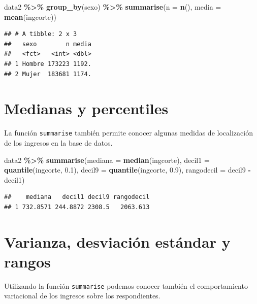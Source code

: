 \documentclass[
  12pt,
]{book}
\newenvironment{Shaded}{\begin{snugshade}}{\end{snugshade}}
\newcommand{\AttributeTok}[1]{\textcolor[rgb]{0.13,0.29,0.53}{#1}}
\newcommand{\FloatTok}[1]{\textcolor[rgb]{0.00,0.00,0.81}{#1}}
\newcommand{\FunctionTok}[1]{\textcolor[rgb]{0.13,0.29,0.53}{\textbf{#1}}}
\newcommand{\NormalTok}[1]{#1}
\newcommand{\SpecialCharTok}[1]{\textcolor[rgb]{0.81,0.36,0.00}{\textbf{#1}}}
\begin{document}
\begin{Shaded}
\begin{Highlighting}[]
\NormalTok{data2 }\SpecialCharTok{\%\textgreater{}\%} \FunctionTok{group\_by}\NormalTok{(sexo) }\SpecialCharTok{\%\textgreater{}\%}
  \FunctionTok{summarise}\NormalTok{(}\AttributeTok{n =} \FunctionTok{n}\NormalTok{(),}
            \AttributeTok{media =} \FunctionTok{mean}\NormalTok{(ingcorte))}
\end{Highlighting}
\end{Shaded}

\begin{verbatim}
## # A tibble: 2 x 3
##   sexo        n media
##   <fct>   <int> <dbl>
## 1 Hombre 173223 1192.
## 2 Mujer  183681 1174.
\end{verbatim}

\section{Medianas y percentiles}\label{medianas-y-percentiles}

La función \texttt{summarise} también permite conocer algunas medidas de localización de los ingresos en la base de datos.

\begin{Shaded}
\begin{Highlighting}[]
\NormalTok{data2 }\SpecialCharTok{\%\textgreater{}\%} \FunctionTok{summarise}\NormalTok{(}\AttributeTok{mediana =} \FunctionTok{median}\NormalTok{(ingcorte),}
                    \AttributeTok{decil1 =} \FunctionTok{quantile}\NormalTok{(ingcorte, }\FloatTok{0.1}\NormalTok{),}
                    \AttributeTok{decil9 =} \FunctionTok{quantile}\NormalTok{(ingcorte, }\FloatTok{0.9}\NormalTok{),}
                    \AttributeTok{rangodecil =}\NormalTok{ decil9 }\SpecialCharTok{{-}}\NormalTok{ decil1)}
\end{Highlighting}
\end{Shaded}

\begin{verbatim}
##    mediana   decil1 decil9 rangodecil
## 1 732.8571 244.8872 2308.5   2063.613
\end{verbatim}

\section{Varianza, desviación estándar y rangos}\label{varianza-desviaciuxf3n-estuxe1ndar-y-rangos}

Utilizando la función \texttt{summarise} podemos conocer también el comportamiento variacional de los ingresos sobre los respondientes.
\end{document}
